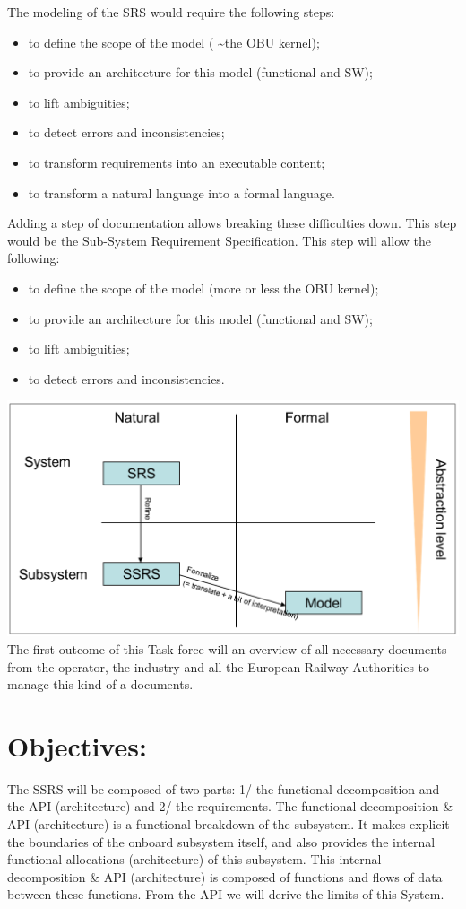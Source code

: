 \documentclass{template/openetcs_article}
\begin{document}
The modeling of the SRS would require the following steps:
\begin{itemize}
  \item to define the scope of the model ( \textasciitilde the OBU kernel);
  \item	to provide an architecture for this model (functional and SW);
  \item to lift ambiguities;
  \item to detect errors and inconsistencies;
  \item to transform requirements into an executable content;
  \item to transform a natural language into a formal language.
\end{itemize}
Adding a step of documentation allows breaking these difficulties down. This step would be the Sub-System Requirement Specification. This step will allow the following:
\begin{itemize}
\item	to define the scope of the model (more or less the OBU kernel);
\item	to provide an architecture for this model (functional and SW);
\item	to lift ambiguities;
\item	to detect errors and inconsistencies.
\end{itemize}
\includegraphics[width=15cm]{figs/abstraction_level}
The first outcome of this Task force will an overview of all necessary documents from the operator, the industry and all the European Railway Authorities to manage this kind of a documents.

\section{Objectives:}
The SSRS will be composed of two parts: 1/ the functional decomposition and the API (architecture) and 2/ the requirements.\newline
The functional decomposition \& API (architecture) is a functional breakdown of the subsystem. It makes explicit the boundaries of the onboard subsystem itself, and also provides the internal functional allocations (architecture) of this subsystem. This internal decomposition \& API (architecture) is composed of functions and flows of data between these functions. From the API we will derive the limits of this System.
\end{document}
